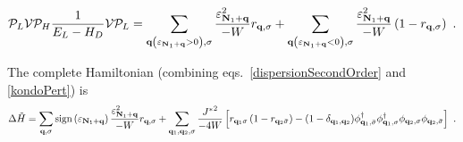 \documentclass[reprint,hidelinks,onecolumn]{revtex4-2}
\begin{document}
\begin{equation}\begin{aligned}\label{dispersionSecondOrder}
	\mathcal{P}_L \mathcal{V} \mathcal{P}_H\frac{1}{E_L - H_D} \mathcal{V} \mathcal{P}_L = \sum_{{\bf q} \left(\varepsilon_{{\bf N}_1 + {\bf q}} > 0\right), \sigma}\frac{\varepsilon_{{\bf N}_1 + {\bf q}}^2}{-W} r_{{\bf q},\sigma} + \sum_{{\bf q} \left(\varepsilon_{{\bf N}_1 + {\bf q}} < 0\right), \sigma}\frac{\varepsilon_{{\bf N}_1 + {\bf q}}^2}{-W} \left(1 - r_{{\bf q},\sigma}\right)~.
\end{aligned}\end{equation}

The complete Hamiltonian (combining eqs.~\ref{dispersionSecondOrder} and \ref{kondoPert}) is
\begin{equation}\begin{aligned}
	\Delta \tilde H = \sum_{{\bf q}, \sigma}\text{sign}\left(\varepsilon_{{\bf N}_1 + {\bf q}}\right)\frac{\varepsilon_{{\bf N}_1 + {\bf q}}^2}{-W} r_{{\bf q},\sigma} + \sum_{{\bf q}_1,{\bf q}_2, \sigma}\frac{{J^*}^2}{-4W}\left[r_{{\bf q}_1 \sigma} \left(1 - r_{{\bf q}_2 \bar\sigma}\right) - (1 - \delta_{{\bf q}_1,{\bf q}_2})\phi^\dagger_{{\bf q}_1,\bar\sigma}\phi^\dagger_{{\bf q}_1,\sigma}\phi_{{\bf q}_2, \sigma}\phi_{{\bf q}_2, \bar\sigma}\right]~.
\end{aligned}\end{equation}
\end{document}

